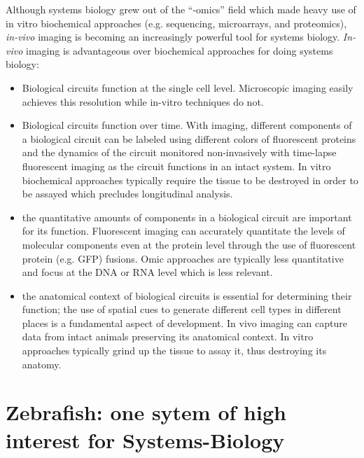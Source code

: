 Although systems biology grew out of the “-omics” field which made heavy use of 
in vitro biochemical approaches (e.g. sequencing, microarrays, and proteomics),
\textit{in-vivo} imaging is becoming an increasingly powerful tool for
systems biology. \textit{In-vivo} imaging is advantageous over
biochemical approaches for doing systems biology:

\begin{itemize}
 \item Biological circuits function at the single cell level. Microscopic
imaging easily achieves this resolution while in-vitro techniques do not.
 \item Biological circuits function over time. With imaging, different
components of a biological circuit can be labeled using different colors of
fluorescent proteins and the dynamics of the circuit monitored non-invasively
with time-lapse fluorescent imaging as the circuit functions in an intact
system. In vitro biochemical approaches typically require the tissue to
be destroyed in order to be assayed which precludes longitudinal analysis.
 \item the quantitative amounts of components in a biological circuit are
important for its function. Fluorescent imaging can accurately quantitate the
levels of molecular components even at the protein level through the use of
fluorescent protein (e.g. GFP) fusions. Omic approaches are typically less
quantitative and focus at the DNA or RNA level which is less relevant.
 \item the anatomical context of biological circuits is essential for
determining their function; the use of spatial cues to generate different cell
types in different places is a fundamental aspect of development. In vivo
imaging can capture data from intact animals preserving its anatomical context.
In vitro approaches typically grind up the tissue to assay it, thus destroying
its anatomy.
\end{itemize}


\section{Zebrafish: one sytem of high interest for Systems-Biology}

